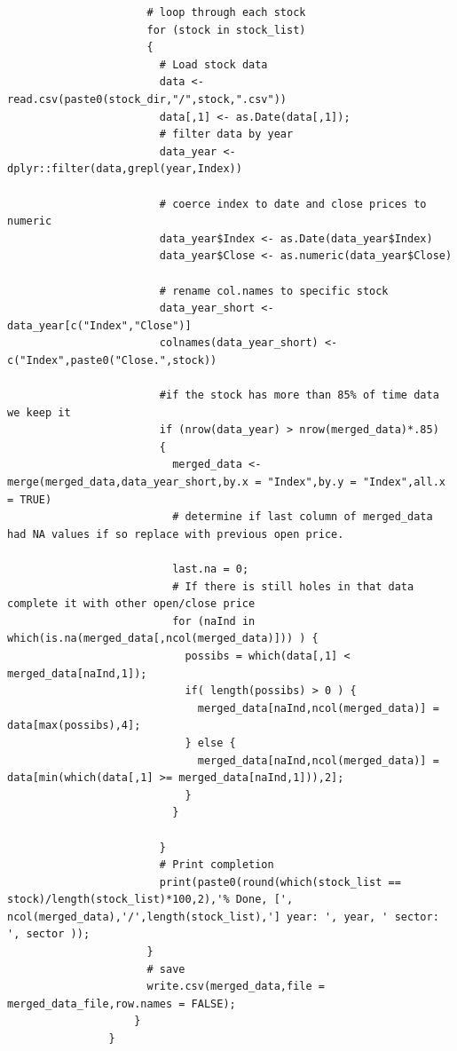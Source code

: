 \documentclass[12pt,titlepage,letter]{article}
\begin{document}
\begin{verbatim}
				      # loop through each stock
				      for (stock in stock_list)
				      {
				        # Load stock data
				        data <- read.csv(paste0(stock_dir,"/",stock,".csv"))
				        data[,1] <- as.Date(data[,1]);
				        # filter data by year
				        data_year <- dplyr::filter(data,grepl(year,Index))
				        
				        # coerce index to date and close prices to numeric
				        data_year$Index <- as.Date(data_year$Index)
				        data_year$Close <- as.numeric(data_year$Close)
				        
				        # rename col.names to specific stock
				        data_year_short <- data_year[c("Index","Close")]
				        colnames(data_year_short) <- c("Index",paste0("Close.",stock))
				        
				        #if the stock has more than 85% of time data we keep it
				        if (nrow(data_year) > nrow(merged_data)*.85) 
				        {
				          merged_data <- merge(merged_data,data_year_short,by.x = "Index",by.y = "Index",all.x = TRUE)
				          # determine if last column of merged_data had NA values if so replace with previous open price. 
				          
				          last.na = 0;
				          # If there is still holes in that data complete it with other open/close price
				          for (naInd in which(is.na(merged_data[,ncol(merged_data)])) ) {
				            possibs = which(data[,1] < merged_data[naInd,1]);
				            if( length(possibs) > 0 ) {
				              merged_data[naInd,ncol(merged_data)] = data[max(possibs),4];
				            } else {
				              merged_data[naInd,ncol(merged_data)] = data[min(which(data[,1] >= merged_data[naInd,1])),2];
				            }
				          }
				          
				        }
				        # Print completion
				        print(paste0(round(which(stock_list == stock)/length(stock_list)*100,2),'% Done, [', ncol(merged_data),'/',length(stock_list),'] year: ', year, ' sector: ', sector ));
				      }
				      # save
				      write.csv(merged_data,file = merged_data_file,row.names = FALSE);
				    }
				}
			\end{verbatim}
\end{document}
